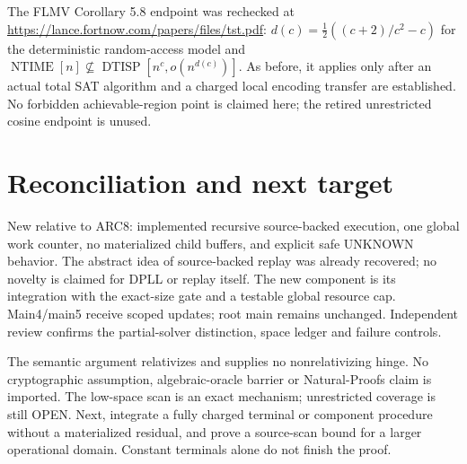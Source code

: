 \documentclass[11pt]{article}
\begin{document}
The FLMV Corollary 5.8 endpoint was rechecked at
\url{https://lance.fortnow.com/papers/files/tst.pdf}:
$d(c)=\tfrac12((c+2)/c^2-c)$ for the deterministic random-access model and
$\operatorname{NTIME}[n]\not\subseteq\operatorname{DTISP}[n^c,o(n^{d(c)})]$.
As before, it applies only after an actual total SAT algorithm and a charged
local encoding transfer are established. No forbidden achievable-region
point is claimed here; the retired unrestricted cosine endpoint is unused.

\section{Reconciliation and next target}
New relative to ARC8: implemented recursive source-backed execution, one global
work counter, no materialized child buffers, and explicit safe UNKNOWN behavior.
The abstract idea of source-backed replay was already recovered; no novelty is
claimed for DPLL or replay itself. The new component is its integration with
the exact-size gate and a testable global resource cap. Main4/main5 receive
scoped updates; root main remains unchanged. Independent review confirms the
partial-solver distinction, space ledger and failure controls.

The semantic argument relativizes and supplies no nonrelativizing hinge.
No cryptographic assumption, algebraic-oracle barrier or Natural-Proofs claim
is imported. The low-space scan is an exact mechanism; unrestricted coverage
is still OPEN. Next, integrate a fully charged terminal or component procedure
without a materialized residual, and prove a source-scan bound for a larger
operational domain. Constant terminals alone do not finish the proof.
\end{document}
